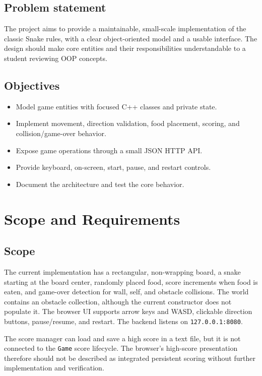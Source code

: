 \documentclass[12pt,a4paper]{report}
\begin{document}
\section{Problem statement}
The project aims to provide a maintainable, small-scale implementation of the
classic Snake rules, with a clear object-oriented model and a usable interface.
The design should make core entities and their responsibilities understandable
to a student reviewing OOP concepts.

\section{Objectives}
\begin{itemize}[leftmargin=*]
  \item Model game entities with focused C++ classes and private state.
  \item Implement movement, direction validation, food placement, scoring, and
        collision/game-over behavior.
  \item Expose game operations through a small JSON HTTP API.
  \item Provide keyboard, on-screen, start, pause, and restart controls.
  \item Document the architecture and test the core behavior.
\end{itemize}

\chapter{Scope and Requirements}
\section{Scope}
The current implementation has a rectangular, non-wrapping board, a snake
starting at the board center, randomly placed food, score increments when food
is eaten, and game-over detection for wall, self, and obstacle collisions.
The world contains an obstacle collection, although the current constructor
does not populate it. The browser UI supports arrow keys and WASD, clickable
direction buttons, pause/resume, and restart. The backend listens on
\texttt{127.0.0.1:8080}.

The score manager can load and save a high score in a text file, but it is not
connected to the \texttt{Game} score lifecycle. The browser's high-score
presentation therefore should not be described as integrated persistent
scoring without further implementation and verification.
\end{document}
